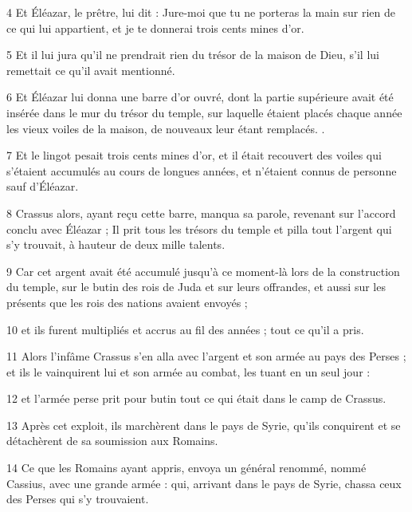 \par 4 Et Éléazar, le prêtre, lui dit : Jure-moi que tu ne porteras la main sur rien de ce qui lui appartient, et je te donnerai trois cents mines d'or.

\par 5 Et il lui jura qu'il ne prendrait rien du trésor de la maison de Dieu, s'il lui remettait ce qu'il avait mentionné.

\par 6 Et Éléazar lui donna une barre d'or ouvré, dont la partie supérieure avait été insérée dans le mur du trésor du temple, sur laquelle étaient placés chaque année les vieux voiles de la maison, de nouveaux leur étant remplacés. .

\par 7 Et le lingot pesait trois cents mines d'or, et il était recouvert des voiles qui s'étaient accumulés au cours de longues années, et n'étaient connus de personne sauf d'Éléazar.

\par 8 Crassus alors, ayant reçu cette barre, manqua sa parole, revenant sur l'accord conclu avec Éléazar ; Il prit tous les trésors du temple et pilla tout l'argent qui s'y trouvait, à hauteur de deux mille talents.

\par 9 Car cet argent avait été accumulé jusqu'à ce moment-là lors de la construction du temple, sur le butin des rois de Juda et sur leurs offrandes, et aussi sur les présents que les rois des nations avaient envoyés ;

\par 10 et ils furent multipliés et accrus au fil des années ; tout ce qu'il a pris.

\par 11 Alors l'infâme Crassus s'en alla avec l'argent et son armée au pays des Perses ; et ils le vainquirent lui et son armée au combat, les tuant en un seul jour :

\par 12 et l'armée perse prit pour butin tout ce qui était dans le camp de Crassus.

\par 13 Après cet exploit, ils marchèrent dans le pays de Syrie, qu'ils conquirent et se détachèrent de sa soumission aux Romains.

\par 14 Ce que les Romains ayant appris, envoya un général renommé, nommé Cassius, avec une grande armée : qui, arrivant dans le pays de Syrie, chassa ceux des Perses qui s'y trouvaient.

